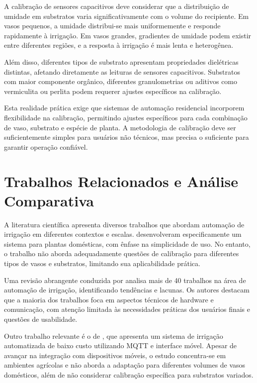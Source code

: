 \documentclass[twoside,english,brazilian]{UNISINOSmonografia}
\begin{document}
A calibração de sensores capacitivos deve considerar que a distribuição de umidade em substratos varia significativamente com o volume do recipiente. Em vasos pequenos, a umidade distribui-se mais uniformemente e responde rapidamente à irrigação. Em vasos grandes, gradientes de umidade podem existir entre diferentes regiões, e a resposta à irrigação é mais lenta e heterogênea.

Além disso, diferentes tipos de substrato apresentam propriedades dielétricas distintas, afetando diretamente as leituras de sensores capacitivos. Substratos com maior componente orgânico, diferentes granulometrias ou aditivos como vermiculita ou perlita podem requerer ajustes específicos na calibração.

Esta realidade prática exige que sistemas de automação residencial incorporem flexibilidade na calibração, permitindo ajustes específicos para cada combinação de vaso, substrato e espécie de planta. A metodologia de calibração deve ser suficientemente simples para usuários não técnicos, mas precisa o suficiente para garantir operação confiável.

\section{Trabalhos Relacionados e Análise Comparativa}

A literatura científica apresenta diversos trabalhos que abordam automação de irrigação em diferentes contextos e escalas.  desenvolveram especificamente um sistema para plantas domésticas, com ênfase na simplicidade de uso. No entanto, o trabalho não aborda adequadamente questões de calibração para diferentes tipos de vasos e substratos, limitando sua aplicabilidade prática.

Uma revisão abrangente conduzida por  analisa mais de 40 trabalhos na área de automação de irrigação, identificando tendências e lacunas. Os autores destacam que a maioria dos trabalhos foca em aspectos técnicos de hardware e comunicação, com atenção limitada às necessidades práticas dos usuários finais e questões de usabilidade.

Outro trabalho relevante é o de , que apresenta um sistema de irrigação automatizada de baixo custo utilizando MQTT e interface móvel. Apesar de avançar na integração com dispositivos móveis, o estudo concentra-se em ambientes agrícolas e não aborda a adaptação para diferentes volumes de vasos domésticos, além de não considerar calibração específica para substratos variados.
\end{document}
